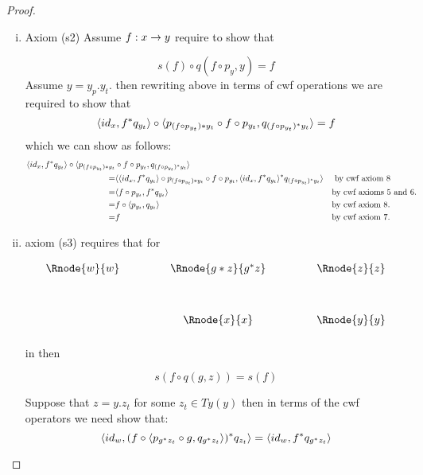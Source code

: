 \begin{proof}
\begin{enumerate}[(i)]
\item Axiom (s2) Assume $f:x \rightarrow y$  require to show that 

\begin{equation}
s(f) \circ q( f \circ p_y     ,y)=f
\end{equation}
Assume 
 $y=y_p.y_t$.
then rewriting above in terms of cwf operations we are required to show that 
\begin{equation}
\langle id_x,f^*q_{y_t}\rangle\circ \langle p_{(f \circ p_{y_t})*y_t}\circ f \circ p_{y_t},
                                    q_{(f \circ p_{y_t})^*y_t}
																		\rangle = f
\end{equation}
which we can show as follows:
\begin{align*}
\langle id_x,f^*q_{y_t}\rangle\circ \langle p_{(f \circ p_{y_t})*y_t}&\circ f \circ p_{y_t}, q_{(f \circ p_{y_t})^*y_t}\rangle \\
=& \langle\langle id_x,f^*q_{y_t}\rangle \circ p_{(f \circ p_{y_t})*y_t}\circ f \circ p_{y_t}, 
				  \langle id_x,f^*q_{y_t}\rangle ^* q_{(f \circ p_{y_t})^*y_t}
         \rangle && \mbox{ by cwf axiom 8} \\
=& \langle f \circ p_{y_t},f^*q_{y_t}\rangle && \mbox{by cwf axioms 5 and 6.} \\
=& f \circ \langle p_{y_t},q_{y_t}\rangle    && \mbox{by cwf axiom 8.} \\
=& f                                  && \mbox{by cwf axiom 7.}
\end{align*}
\item 
axiom (s3) requires that for

\begin{center}
\begin{displaymath}
\begin{array}{c p{.9cm} c p{.9cm} c}
\Rnode{w}{w}&& \Rnode{g*z}{g \sub z} && \Rnode{z}{z} \\ [1.2cm]
            && \Rnode{x}{x}  && \Rnode{y}{y} \\ [0.2cm]
\end{array}
\end{displaymath}
\end{center}

\noindent in  then

\begin{equation}
s(f \circ q(g,z))=s(f)
\end{equation}

Suppose that $z=y.z_t$ for some $z_t \in Ty(y)$ then in terms of the cwf operators we need show that:
\begin{equation}
\langle id_w,(f \circ \langle p_{g^*z_t} \circ g, q_{g^*z_t}\rangle )^* q_{z_t}\rangle = \langle id_w,f^*q_{g^*z_t}\rangle
\end{equation}


\end{enumerate}
\end{proof}
